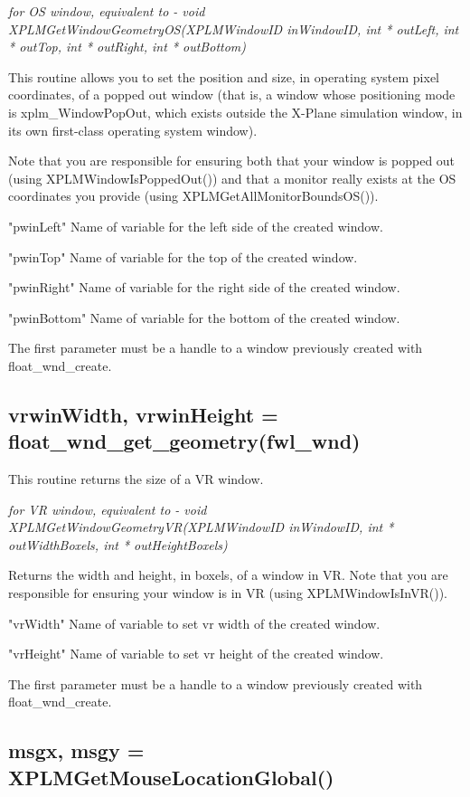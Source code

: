\documentclass[11pt,parskip=half,a4paper]{scrartcl}
\begin{document}
\emph{ for OS window, equivalent to       - void XPLMGetWindowGeometryOS(XPLMWindowID inWindowID, int * outLeft, int * outTop, int * outRight, int * outBottom)}

This routine allows you to set the position and size, in operating system pixel coordinates, of a popped out window (that is, a window whose positioning mode is xplm\_WindowPopOut, which exists outside the X-Plane simulation window, in its own first-class operating system window).

Note that you are responsible for ensuring both that your window is popped out (using XPLMWindowIsPoppedOut()) and that a monitor really exists at the OS coordinates you provide (using XPLMGetAllMonitorBoundsOS()).

"pwinLeft" Name of variable for the left side of the created window.

"pwinTop" Name of variable for the top of the created window.

"pwinRight" Name of variable for the right side of the created window.

"pwinBottom" Name of variable for the bottom of the created window.

The first parameter must be a handle to a window previously created with float\_wnd\_create.



\subsection{\hspace*{1.0mm}vrwinWidth, vrwinHeight = float\_wnd\_get\_geometry(fwl\_wnd)}

This routine returns the size of a VR window.

\emph{ for VR window, equivalent to       - void XPLMGetWindowGeometryVR(XPLMWindowID inWindowID, int * outWidthBoxels, int * outHeightBoxels)}

Returns the width and height, in boxels, of a window in VR. Note that you are responsible for ensuring your window is in VR (using XPLMWindowIsInVR()).

"vrWidth" Name of variable to set vr width of the created window.

"vrHeight" Name of variable to set vr height of the created window.

The first parameter must be a handle to a window previously created with float\_wnd\_create.

\newpage

\subsection{\hspace*{1.0mm}msgx, msgy = XPLMGetMouseLocationGlobal()}
\end{document}
